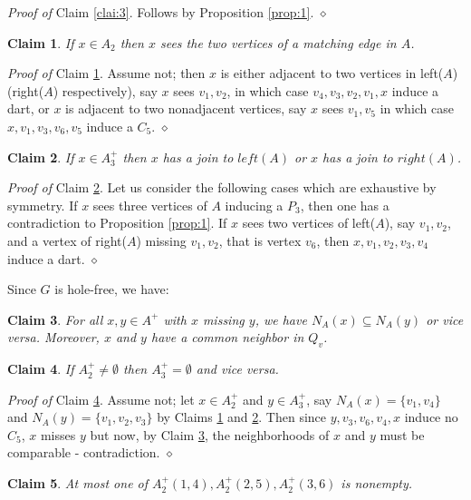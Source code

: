 \documentclass[11pt]{article}
\newcommand{\0}{\text{ has a co-join to }}
\newcommand{\1}{\text{ has a join to }}
\newtheorem{clai}{Claim}[section]
\begin{document}
\noindent
{\em Proof of} Claim \ref{clai:3}. Follows by Proposition \ref{prop:1}. 
${\diamond}$

\begin{clai}\label{clai:4}
If $x \in A_2$ then $x$ sees the two vertices of a matching edge in $A$.
\end{clai}

\noindent
{\em Proof of} Claim \ref{clai:4}. Assume not; then $x$ is either adjacent to two vertices in left($A$) (right($A$) respectively), say $x$ sees $v_1,v_2$, in which case $v_4,v_3,v_2,v_1,x$ induce a dart, or $x$ is adjacent to two nonadjacent vertices, say $x$ sees $v_1,v_5$ in which case $x,v_1,v_3,v_6,v_5$ induce a $C_5$. ${\diamond}$

\begin{clai}\label{clai:5}
If $x \in A_3^+$ then $x$ has a join to $left(A)$ or $x$ has a join to $right(A)$.
\end{clai}

\noindent
{\em Proof of} Claim \ref{clai:5}. Let us consider the following cases which are exhaustive by symmetry. If $x$ sees three vertices of $A$ inducing a $P_3$, then one has a contradiction to Proposition \ref{prop:1}. If $x$ sees two vertices of left($A$), say $v_1,v_2$, and a vertex of right($A$) missing $v_1,v_2$, that is vertex $v_6$, then $x,v_1,v_2,v_3,v_4$ induce a dart. 
${\diamond}$

\medskip

Since $G$ is hole-free, we have:

\begin{clai}\label{clai:7}
For all $x,y \in A^+$ with $x$ missing $y$, we have $N_A(x) \subseteq N_A(y)$ or vice versa. Moreover, $x$ and $y$ have a common neighbor in $Q_v$.
\end{clai}

\begin{clai}\label{clai:8}
If $A_2^+ \neq \emptyset$ then $A_3^+ = \emptyset$ and vice versa.
\end{clai}

\noindent
{\em Proof of} Claim \ref{clai:8}. Assume not; let $x \in A_2^+$ and $y \in A_3^+$, say $N_A(x) = \{v_1,v_4\}$ and $N_A(y) = \{v_1,v_2,v_3\}$ by Claims \ref{clai:4} and \ref{clai:5}. Then since $y,v_3,v_6,v_4,x$ induce no $C_5$, $x$ misses $y$ but now, by Claim \ref{clai:7}, the neighborhoods of $x$ and $y$ must be comparable - contradiction. 
${\diamond}$

\begin{clai}\label{clai:9}
At most one of $A_2^+(1,4),A_2^+(2,5),A_2^+(3,6)$ is nonempty.
\end{clai}
\end{document}
